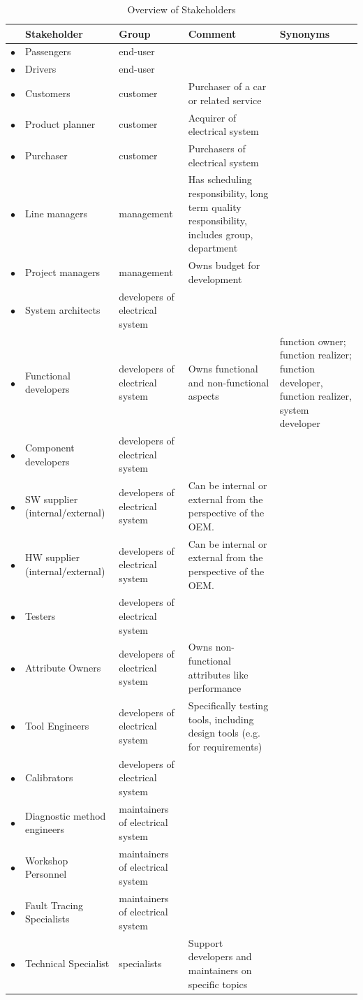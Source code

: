 \begin{table}[htb]
\scriptsize
\caption{Overview of Stakeholders}
\label{tab:stakeholders}
\begin{tabular}{rv{0.14\textwidth}v{0.2\textwidth}v{0.26\textwidth}v{0.2\textwidth}}
\toprule
& \textbf{Stakeholder} &	\textbf{Group} & \textbf{Comment} & \textbf{Synonyms} \tabularnewline
\midrule
$\bullet$& Passengers & end-user	\tabularnewline
$\bullet$& Drivers & end-user		\tabularnewline
$\bullet$& Customers & customer & Purchaser of a car or related service & \tabularnewline
$\bullet$& Product planner & customer & Acquirer of electrical system		\tabularnewline
$\bullet$& Purchaser & customer & Purchasers of electrical system		\tabularnewline
$\bullet$& Line managers & management & Has scheduling responsibility, long term quality responsibility, includes group, department	\tabularnewline
$\bullet$& Project managers & management & Owns budget for development	\tabularnewline
$\bullet$& System architects & developers of electrical system & 	\tabularnewline
$\bullet$& Functional developers & developers of electrical system & Owns functional and non-functional aspects & function owner; function realizer; function developer, function realizer, system developer\tabularnewline
$\bullet$& Component developers & developers of electrical system		\tabularnewline
$\bullet$& SW supplier (internal/external) & developers of electrical system	& Can be internal or external from the perspective of the OEM.	\tabularnewline
$\bullet$& HW supplier (internal/external) & developers of electrical system	& Can be internal or external from the perspective of the OEM.	\tabularnewline
$\bullet$& Testers & developers of electrical system		\tabularnewline
$\bullet$& Attribute Owners & developers of electrical system & Owns non-functional attributes like performance	\tabularnewline
$\bullet$& Tool Engineers & developers of electrical system & Specifically testing tools, including design tools (e.g. for requirements)	\tabularnewline
$\bullet$& Calibrators & developers of electrical system & \tabularnewline
$\bullet$& Diagnostic method engineers & maintainers of electrical system		\tabularnewline
$\bullet$& Workshop Personnel & maintainers of electrical system		\tabularnewline
$\bullet$& Fault Tracing Specialists & maintainers of electrical system		\tabularnewline
$\bullet$& Technical Specialist &  specialists &	Support developers and maintainers on specific topics \tabularnewline
\bottomrule
\end{tabular}
\end{table}

